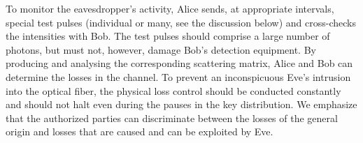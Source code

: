 \documentclass[a4paper]{article}
\begin{document}
 
 
 
 


To monitor the eavesdropper's activity, Alice sends, at appropriate intervals, special test pulses (individual or many, see the discussion below) and cross-checks the intensities with Bob. 
The test pulses should comprise a large number of photons, but must not, however, damage Bob's detection equipment.
By producing and analysing the corresponding scattering matrix, Alice and Bob can determine the losses in the channel.
To prevent an inconspicuous Eve's intrusion into the optical fiber, the physical loss control should be conducted constantly and should not halt even during the pauses in the key distribution.
We emphasize that the authorized parties can discriminate between the losses of the general origin and losses that are caused and can be exploited by Eve.
\end{document}
